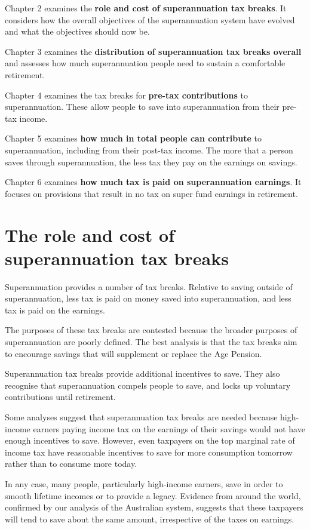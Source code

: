 Chapter 2 examines the \textbf{role and cost of superannuation tax breaks}. It considers how the overall objectives of the superannuation system have evolved and what the objectives should now be.

Chapter 3 examines the \textbf{distribution of superannuation tax breaks overall} and assesses how much superannuation people need to sustain a comfortable retirement.  

Chapter 4 examines the tax breaks for \textbf{pre-tax contributions} to superannuation. These allow people to save into superannuation from their pre-tax income.

Chapter 5 examines \textbf{how much in total people can contribute} to superannuation, including from their post-tax income. The more that a person saves through superannuation, the less tax they pay on the earnings on savings.

Chapter 6 examines \textbf{how much tax is paid on superannuation earnings}. It focuses on provisions that result in no tax on super fund earnings in retirement.

\chapter{The role and cost of superannuation tax breaks}
Superannuation provides a number of tax breaks. Relative to saving outside of superannuation, less tax is paid on money saved into superannuation, and less tax is paid on the earnings.

The purposes of these tax breaks are contested because the broader purposes of superannuation are poorly defined. The best analysis is that the tax breaks aim to encourage savings that will supplement or replace the Age Pension. 

Superannuation tax breaks provide additional incentives to save. They also recognise that superannuation compels people to save, and locks up voluntary contributions until retirement.

Some analyses suggest that superannuation tax breaks are needed because high-income earners paying income tax on the earnings of their savings would not have enough incentives to save. However, even taxpayers on the top marginal rate of income tax have reasonable incentives to save for more consumption tomorrow rather than to consume more  today.

In any case, many people, particularly high-income earners, save in order to smooth lifetime incomes or to provide a legacy. Evidence from around the world, confirmed by our analysis of the Australian system, suggests that these taxpayers will tend to save about the same amount, irrespective of the taxes on earnings.

